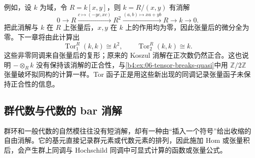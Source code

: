 例如，设 \(k\) 为域，令 \(R=k[x,y]\)，则 \(k=R/(x,y)\) 有消解
\[
	0\longrightarrow R\xrightarrow{c\mapsto(-yc,xc)}R^2 \xrightarrow{(a,b)\mapsto xa+yb}R\longrightarrow k\longrightarrow0.
\]
把此消解与 \(k\) 在 \(R\) 上张量后，\(x,y\) 在 \(k\) 上的作用均为零，因此张量后的微分全为零。下一章将由此计算出
\[
	\operatorname{Tor}_1^R(k,k)\cong k^2, \qquad \operatorname{Tor}_2^R(k,k)\cong k.
\]
这些非零同调来自张量后的复形；原来的 Koszul 消解在正次数仍然正合。这也说明 \(-\otimes_Rk\) 没有保持该消解的正合性，与\cref{b4:ex:06-tensor-breaks-quasi}中用 \(\mathbb Z/2\mathbb Z\) 张量破坏拟同构的计算一样。Tor 函子正是用这些新出现的同调记录张量函子未保持正合性的信息。

\subsection{群代数与代数的 bar 消解}
\label{b4:subsec:0704:03}

群环和一般代数的自然模往往没有短消解，却有一种由“插入一个符号”给出收缩的自由消解。它的基元直接记录群元素或代数元素的排列，因此施加 Hom 或张量积后，会产生群上同调与 Hochschild 同调中可显式计算的函数或张量公式。

